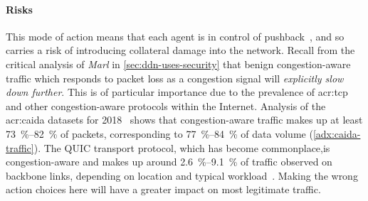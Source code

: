 \paragraph{Risks}
This mode of action means that each agent is in control of pushback~\parencite{DBLP:journals/ccr/MahajanBFIPS02a}, and so carries a risk of introducing collateral damage into the network.
Recall from the critical analysis of \emph{Marl} in \cref{sec:ddn-uses-security} that benign congestion-aware traffic which responds to packet loss as a congestion signal will \emph{explicitly slow down further}.
This is of particular importance due to the prevalence of \gls{acr:tcp} and other congestion-aware protocols within the Internet.
Analysis of the \gls{acr:caida} datasets for 2018~\parencite{caida-2018-passive} shows that congestion-aware traffic makes up at least \qtyrange{73}{82}{\percent} of packets, corresponding to \qtyrange{77}{84}{\percent} of data volume (\cref{adx:caida-traffic}).
The QUIC transport protocol, which has become commonplace,is congestion-aware and makes up around \qtyrange{2.6}{9.1}{\percent} of traffic observed on backbone links, depending on location and typical workload~\parencite{DBLP:conf/pam/RuthPDH18}.
Making the wrong action choices here will have a greater impact on most legitimate traffic.

